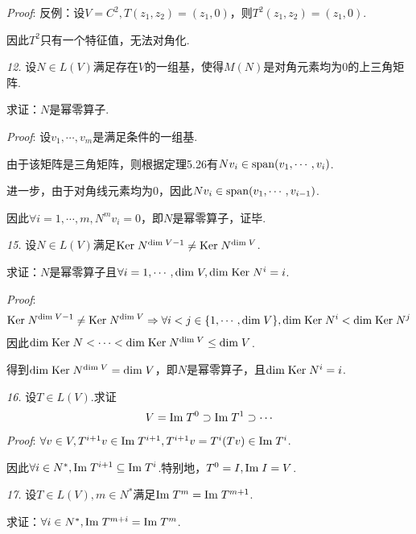 \textit{Proof}:
反例：设\(V=C^2,T(z_1,z_2)=(z_1,0)\)，则\(T^2(z_1,z_2)=(z_1,0)\).

因此\(T^2\)只有一个特征值，无法对角化.

\newpage

\textit{12.}
设\(N \in L(V)\)满足存在\(V\)的一组基，使得\(M(N)\)是对角元素均为\(0\)的上三角矩阵.

求证：\(N\)是幂零算子.

\textit{Proof}:
设\(v_1,\cdots,v_m\)是满足条件的一组基.

由于该矩阵是三角矩阵，则根据定理5.26有\(Nv_i \in \mathrm{span} (v_1,\cdots,v_i)\).

进一步，由于对角线元素均为\(0\)，因此\(Nv_i \in \mathrm{span} (v_1,\cdots,v_{i-1})\).

因此\(\forall i=1,\cdots,m,N^m v_i=0\)，即\(N\)是幂零算子，证毕.

\hspace*{\fill}

\textit{15.}
设\(N \in L(V)\)满足\(\mathrm{Ker \;} N^{\mathrm{dim \;} V-1} \ne \mathrm{Ker \;} N^{\mathrm{dim \;} V}\).

求证：\(N\)是幂零算子且\(\forall i=1,\cdots,\mathrm{dim \;} V,\mathrm{dim \;} \mathrm{Ker \;} N^i=i\).

\textit{Proof}:
    \begin{align*}
        \mathrm{Ker \;} N^{\mathrm{dim \;} V-1} \ne \mathrm{Ker \;} N^{\mathrm{dim \;} V} \Rightarrow 
        \forall i<j \in \{1,\cdots,\mathrm{dim \;} V\},\mathrm{dim \;} \mathrm{Ker \;} N^i<\mathrm{dim \;} \mathrm{Ker \;} N^j
    \end{align*}
因此\(\mathrm{dim \;} \mathrm{Ker \;} N<\cdots<\mathrm{dim \;} \mathrm{Ker \;} N^{\mathrm{dim \;} V} \leq \mathrm{dim \;} V\).

得到\(\mathrm{dim \;} \mathrm{Ker \;} N^{\mathrm{dim \;} V}=\mathrm{dim \;} V\)，即\(N\)是幂零算子，且\(\mathrm{dim \;} \mathrm{Ker \;} N^i=i\).

\hspace*{\fill}

\textit{16.}
设\(T \in L(V)\).求证
    \begin{align*}
        V=\mathrm{Im \;} T^0 \supset \mathrm{Im \;} T^1 \supset \cdots
    \end{align*}
\textit{Proof}:
\(\forall v \in V,T^{i+1}v \in \mathrm{Im \;} T^{i+1},T^{i+1}v=T^i(Tv) \in \mathrm{Im \;} T^i\).

因此\(\forall i \in N^*,\mathrm{Im \;} T^{i+1} \subseteq \mathrm{Im \;} T^i\).特别地，\(T^0=I,\mathrm{Im \;} I=V\).

\hspace*{\fill}

\textit{17.}
设\(T \in L(V),m \in N^*\)满足\(\mathrm{Im \;} T^m=\mathrm{Im \;} T^{m+1}\).

求证：\(\forall i \in N^*,\mathrm{Im \;} T^{m+i}=\mathrm{Im \;} T^m\).

